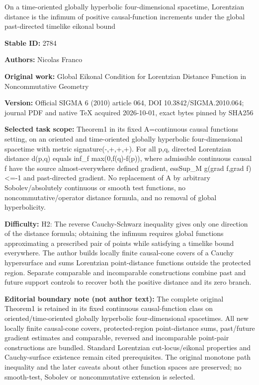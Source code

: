 \documentclass[11pt]{article}
\begin{document}
\begin{center}\Large On a time-oriented globally hyperbolic four-dimensional spacetime, Lorentzian distance is the infimum of positive causal-function increments under the global past-directed timelike eikonal bound\end{center}
\noindent\textbf{Stable ID:} 2784\par
\noindent\textbf{Authors:} Nicolas Franco\par
\noindent\textbf{Original work:} Global Eikonal Condition for Lorentzian Distance Function in Noncommutative Geometry\par
\noindent\textbf{Version:} Official SIGMA 6 (2010) article 064, DOI 10.3842/SIGMA.2010.064; journal PDF and native TeX acquired 2026-10-01, exact bytes pinned by SHA256\par
\noindent\textbf{Selected task scope:} Theorem1 in its fixed A=\allowbreak{}continuous causal functions setting, on an oriented and time-oriented globally hyperbolic four-dimensional spacetime with metric signature(-,+\allowbreak{},+\allowbreak{},+\allowbreak{}). For all p,q, directed Lorentzian distance d(p,q) equals inf\_f max(0,f(q)-f(p)), where admissible continuous causal f have the source almost-everywhere defined gradient, essSup\_M g(grad f,grad f)<=\allowbreak{}-1 and past-directed gradient. No replacement of A by arbitrary Sobolev/absolutely continuous or smooth test functions, no noncommutative/operator distance formula, and no removal of global hyperbolicity.\par
\noindent\textbf{Difficulty:} H2: The reverse Cauchy-Schwarz inequality gives only one direction of the distance formula; obtaining the infimum requires global functions approximating a prescribed pair of points while satisfying a timelike bound everywhere. The author builds locally finite causal-cone covers of a Cauchy hypersurface and sums Lorentzian point-distance functions outside the protected region. Separate comparable and incomparable constructions combine past and future support controls to recover both the positive distance and its zero branch.\par
\noindent\textbf{Editorial boundary note (not author text):} The complete original Theorem1 is retained in its fixed continuous causal-function class on oriented/time-oriented globally hyperbolic four-dimensional spacetimes. All new locally finite causal-cone covers, protected-region point-distance sums, past/future gradient estimates and comparable, reversed and incomparable point-pair constructions are bundled. Standard Lorentzian cut-locus/eikonal properties and Cauchy-surface existence remain cited prerequisites. The original monotone path inequality and the later caveats about other function spaces are preserved; no smooth-test, Sobolev or noncommutative extension is selected.\par
\end{document}
